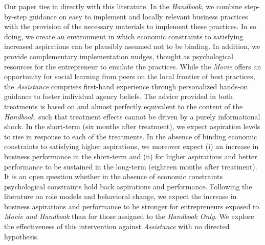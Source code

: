 \documentclass[11.5pt]{article}
\begin{document}
Our paper ties in directly with this literature. In the \emph{Handbook}, we combine step-by-step guidance on easy to implement and locally relevant business practices with the provision of the necessary materials to implement these practices. In so doing, we create an environment in which economic constraints to satisfying increased aspirations can be plausibly assumed not to be binding. In addition, we provide complementary implementation nudges, thought as psychological resources for the entrepreneur to emulate the practices. While the \emph{Movie} offers an opportunity for social learning from peers on the local frontier of best practices, the \emph{Assistance} comprises first-hand experience through personalized hands-on guidance to foster individual agency beliefs. The advice provided in both treatments is based on and almost perfectly equivalent to the content of the \emph{Handbook}, such that treatment effects cannot be driven by a purely informational shock. In the short-term (six months after treatment), we expect aspiration levels to rise in response to each of the treatments. In the absence of binding economic constraints to satisfying higher aspirations, we moreover expect (i) an increase in business performance in the short-term and (ii) for higher aspirations and better performance to be sustained in the long-term (eighteen months after treatment). It is an open question whether in the absence of economic constraints psychological constraints hold back aspirations and performance. Following the literature on role models and behavioral change, we expect the increase in business aspirations and performance to be stronger for entrepreneurs exposed to \emph{Movie and Handbook} than for those assigned to the \emph{Handbook Only}. We explore the effectiveness of this intervention against \emph{Assistance} with no directed hypothesis.%

\end{document}
